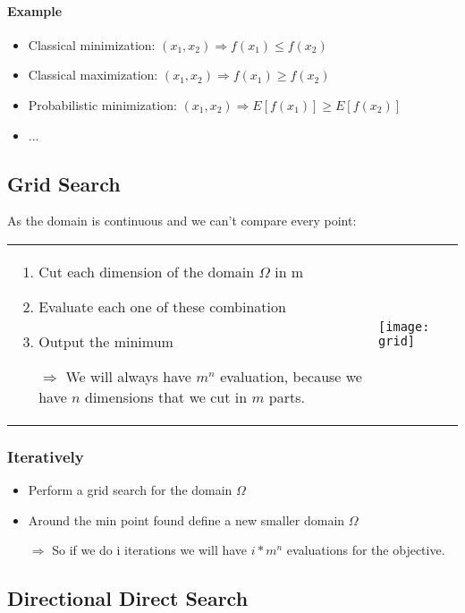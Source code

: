 \paragraph{Example}
\begin{itemize}
    \item Classical minimization: $(x_1, x_2) \Rightarrow f(x_1)\leq
        f(x_2)$
    \item Classical maximization: $(x_1, x_2) \Rightarrow f(x_1)\geq
        f(x_2)$
    \item Probabilistic minimization: $(x_1, x_2) \Rightarrow E[f(x_1)]\geq
        E[f(x_2)]$
    \item ...
\end{itemize}

\subsection{Grid Search}

As the domain is continuous and we can't compare every point:

\begin{tabular}{m{10cm}m{7cm}}
\begin{enumerate}
    \item Cut each dimension of the domain $\Omega$ in m
    \item Evaluate each one of these combination 
    \item Output the minimum

    \item[$\Rightarrow$]  We will always have $m^n$ evaluation,
        because we have $n$ dimensions that
we cut in $m$ parts.
\end{enumerate}
&
\texttt{[image: grid]}
\end{tabular}

\subsubsection{Iteratively}
\begin{itemize}
    \item Perform a grid search for the domain $\Omega$ 
    \item Around the min point found define a new smaller domain
        $\Omega$ 
    \item[$\Rightarrow$] So if we do i iterations we will have $i *
        m^n$ evaluations for the objective.
\end{itemize}

\subsection{Directional Direct Search}

